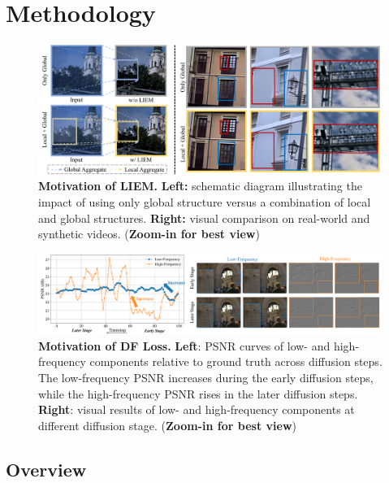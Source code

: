 \section{Methodology}
\label{sec:methodology}

\begin{figure}[t!]
    \centering
    \includegraphics[width=0.98\linewidth]{figure/liem_motivation.pdf}\vspace{-2mm}
    \caption{\textbf{Motivation of LIEM.} \textbf{Left:} schematic diagram illustrating the impact of using only global structure versus a combination of local and global structures. \textbf{Right:} visual comparison on real-world and synthetic videos. (\textbf{Zoom-in for best view})}
    \label{motivation:liem}
\end{figure}

\begin{figure}[t!]
    \centering
    \includegraphics[width=1\linewidth]{figure/daf_motivation.pdf}
    \caption{\textbf{Motivation of DF Loss.} \textbf{Left}: PSNR curves of low- and high-frequency components relative to ground truth across diffusion steps. The low-frequency PSNR increases during the early diffusion steps, while the high-frequency PSNR rises in the later diffusion steps. 
    \textbf{Right}: visual results of low- and high-frequency components at different diffusion stage. (\textbf{Zoom-in for best view})}
    \label{motivation:daf}
\end{figure}

\subsection{Overview}
\label{subsec:overview}

